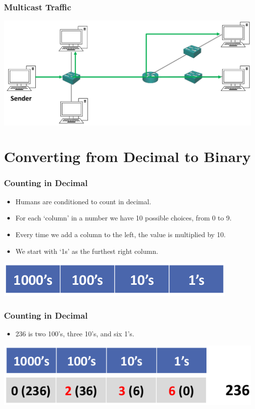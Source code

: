 \documentclass[pdflatex,compress]{beamer}
\begin{document}
\begin{frame}
	\frametitle{Multicast Traffic}
	\begin{center}
		\includegraphics[width=\linewidth]{img/img13}
	\end{center}
\end{frame}

\section{Converting from Decimal to Binary}

\begin{frame}
	\frametitle{Counting in Decimal}
	\begin{itemize}
		\item Humans are conditioned to count in decimal.
		\item For each ‘column’ in a number we have 10 possible choices, from 0 to 9.
		\item Every time we add a column to the left, the value is multiplied by 10.
		\item We start with ‘1s’ as the furthest right column.
	\end{itemize}
	\begin{center}
		\includegraphics[width=0.5\linewidth]{img/img14}
	\end{center}
\end{frame}

\begin{frame}
	\frametitle{Counting in Decimal}
	\begin{itemize}
		\item 236 is two 100’s, three 10’s, and six 1’s.
	\end{itemize}
	\begin{center}
		\includegraphics[width=0.6\linewidth]{img/img15}
	\end{center}
\end{frame}
\end{document}
